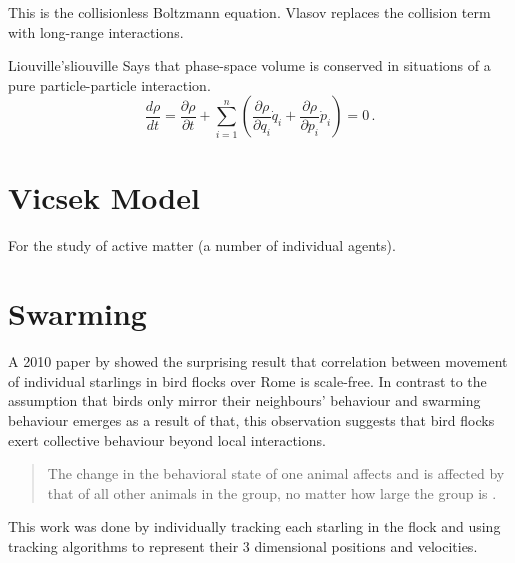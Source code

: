 This is the collisionless Boltzmann equation.
Vlasov replaces the collision term with long-range interactions.

\begin{theorem}{Liouville's}{liouville}
  Says that phase-space volume is conserved in situations of a pure particle-particle interaction.
  $$\frac{d\rho}{dt}=
    \frac{\partial\rho}{\partial t}
    +\sum_{i=1}^n\left(\frac{\partial\rho}{\partial q_i}\dot{q}_i
    +\frac{\partial\rho}{\partial p_i}\dot{p}_i\right)=0\,.$$
\end{theorem}

\section{Vicsek Model}
For the study of active matter (a number of individual agents).

\section{Swarming}
A 2010 paper by \citeauthor{2010-starlings} showed the surprising result that correlation between movement of individual starlings in bird flocks over Rome is scale-free.
In contrast to the assumption that birds only mirror their neighbours' behaviour and swarming behaviour emerges as a result of that, this observation suggests that bird flocks exert collective behaviour beyond local interactions.
\begin{quote}
  The change in the behavioral state of one animal affects and is affected by that of all other animals in the group, no matter how large the group is
  \parencite{2010-starlings}.
\end{quote}
This work was done by individually tracking each starling in the flock and using tracking algorithms to represent their 3 dimensional positions and velocities.
